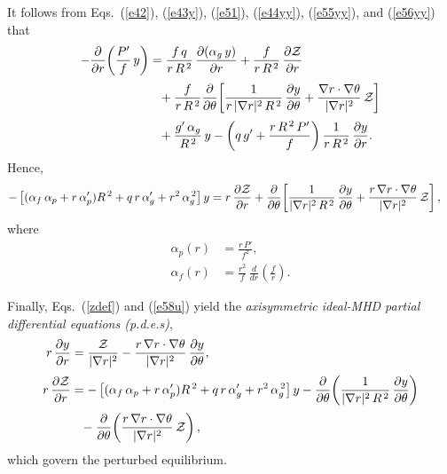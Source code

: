 \documentclass[12pt,prb,aps]{revtex4-1}
\begin{document}
It follows from Eqs.~(\ref{e42}), (\ref{e43y}), (\ref{e51}), (\ref{e44yy}), (\ref{e55yy}), and (\ref{e56yy}) that
\begin{align}
-\frac{\partial}{\partial r}\!\left(\frac{P'}{f}\,y\right)&= \frac{f\,q}{r\,R^{\,2}}\,\frac{\partial (\alpha_g\,y)}{\partial r} 
+ \frac{f}{r\,R^{\,2}}\,\frac{\partial {\cal Z}}{\partial r}\nonumber\\[0.5ex]
&\phantom{=} +\frac{f}{r\,R^{\,2}}\frac{\partial}{\partial\theta}\!\left[\frac{1}{r\,|\nabla r|^2\,R^{\,2}}\,\frac{\partial y}{\partial \theta} + \frac{\nabla r\cdot\nabla\theta}{|\nabla r|^2}\,{\cal Z}\right]
\nonumber\\[0.5ex]
&\phantom{=} + \frac{g'\,\alpha_g}{R^{\,2}}\,y - \left(q\,g'+\frac{r\,R^{\,2}\,P'}{f}\right)\frac{1}{r\,R^{\,2}}\,\frac{\partial y}{\partial r}.
\end{align}
Hence,
\begin{align}\label{e58u}
-\left[(\alpha_f\,\alpha_p+ r\,\alpha_p')R^{\,2} + q\,r\,\alpha_g'+r^2\,\alpha_g^{\,2}\right]y&= 
 r\,\frac{\partial {\cal Z}}{\partial r}+\frac{\partial}{\partial\theta}\!\left[\frac{1}{|\nabla r|^2\,R^{\,2}}\,\frac{\partial y}{\partial \theta} + \frac{r\,\nabla r\cdot\nabla\theta}{|\nabla r|^2}\,{\cal Z}\right],
\end{align}
where
\begin{align}\label{alpp}
\alpha_p(r)&= \frac{r\,P'}{f^2},\\[0.5ex]
\alpha_f(r) &= \frac{r^2}{f}\,\frac{d}{dr}\!\left(\frac{f}{r}\right).\label{alpf}
\end{align}

Finally, Eqs.~(\ref{zdef}) and (\ref{e58u})  yield the {\em axisymmetric ideal-MHD partial differential equations (p.d.e.s)},
\begin{align}\label{e63y}
r\,\frac{\partial y}{\partial r} &= \frac{{\cal Z}}{|\nabla r|^2} - \frac{r\,\nabla r\cdot\nabla\theta}{|\nabla r|^2}\,\frac{\partial y}{\partial\theta},\\[0.5ex]
r\,\frac{\partial {\cal Z}}{\partial r}&= -\left[(\alpha_f\,\alpha_p+ r\,\alpha_p')R^{\,2} + q\,r\,\alpha_g'+r^2\,\alpha_g^{\,2}\right]y-\frac{\partial}{\partial\theta}\!\left(\frac{1}{|\nabla r|^2\,R^{\,2}}\,\frac{\partial y}{\partial\theta}\right)\nonumber\\[0.5ex]
&\phantom{=} -\frac{\partial}{\partial\theta}\!\left(\frac{r\,\nabla r\cdot\nabla\theta}{|\nabla r|^2}\,{\cal Z}\right),\label{e64y}
\end{align}
which govern the perturbed equilibrium. 
\end{document}
